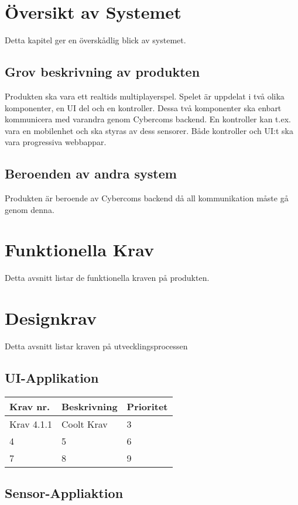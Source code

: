 \documentclass[10pt]{article}
\begin{document}
\section{Översikt av Systemet}
	Detta kapitel ger en överskådlig blick av systemet.

	\subsection{Grov beskrivning av produkten}
	Produkten ska vara ett realtids multiplayerspel. Spelet är uppdelat i två olika komponenter, en UI del och en kontroller. Dessa två komponenter ska enbart kommunicera med varandra genom Cybercoms backend. En kontroller kan t.ex. vara en mobilenhet och ska styras av dess sensorer. Både kontroller och UI:t ska vara progressiva webbappar. 
	
	
	\subsection{Beroenden av andra system}
	Produkten är beroende av Cybercoms backend då all kommunikation måste gå genom denna. 

\section{Funktionella Krav}
	Detta avsnitt listar de funktionella kraven på produkten.
	
\section{Designkrav}
	Detta avsnitt listar kraven på utvecklingsprocessen

	\subsection{UI-Applikation}	
	
	\begin{tabular}{| l | l | l |}
		\hline
		\textbf{Krav nr.} & \textbf{Beskrivnin}g & \textbf{Prioritet} \\ \hline
		Krav 4.1.1 & Coolt Krav & 3\\ \hline
		4 & 5 & 6\\ \hline
		7 & 8 & 9\\ \hline
	\end{tabular}
	
	\subsection{Sensor-Appliaktion}
	
\end{document}
